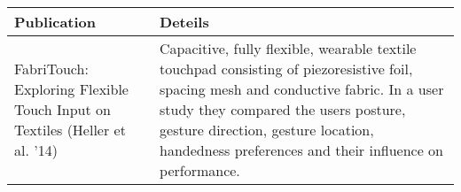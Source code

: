 \documentclass[10pt,a4paper]{article}
\begin{document}
     \begin{tabular}{ | p{3cm} |  p{8.3cm} |}
         \hline
    Publication & Deteils \\ 
    \hline 
     
         FabriTouch: Exploring Flexible Touch Input on Textiles (Heller et al. '14)&
    Capacitive, fully flexible, wearable textile touchpad consisting of piezoresistive foil, spacing mesh and conductive fabric. In a user study they compared the users posture, gesture direction, gesture location, handedness preferences and their influence on  performance. \\
    \hline
     \end{tabular}
\end{document}
